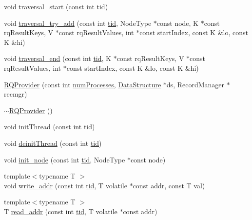 \begin{DoxyCompactItemize}
\item 
void \hyperlink{classRQProvider_a96fe481c7ba6b30efbd90ac1eca1e788}{traversal\+\_\+start} (const int \hyperlink{microbench_2main_8cpp_a9ca9869868fe7e7a38a921cc7de4103f}{tid})
\item 
void \hyperlink{classRQProvider_ae67024f11a58a4a3e4a6cb86b7ed8292}{traversal\+\_\+try\+\_\+add} (const int \hyperlink{microbench_2main_8cpp_a9ca9869868fe7e7a38a921cc7de4103f}{tid}, Node\+Type $\ast$const node, K $\ast$const rq\+Result\+Keys, V $\ast$const rq\+Result\+Values, int $\ast$const start\+Index, const K \&lo, const K \&hi)
\item 
void \hyperlink{classRQProvider_ad4bbd6a7d5ea8f497a49ba3bbd03f7fc}{traversal\+\_\+end} (const int \hyperlink{microbench_2main_8cpp_a9ca9869868fe7e7a38a921cc7de4103f}{tid}, K $\ast$const rq\+Result\+Keys, V $\ast$const rq\+Result\+Values, int $\ast$const start\+Index, const K \&lo, const K \&hi)
\item 
\hyperlink{classRQProvider_a657b85f70daa72353de19671d40bbc22}{R\+Q\+Provider} (const int \hyperlink{testing_8cpp_aa085812188e21ede75351d88b9b2c30d}{num\+Processes}, \hyperlink{classDataStructure}{Data\+Structure} $\ast$ds, Record\+Manager $\ast$recmgr)
\item 
\hyperlink{classRQProvider_aefeec3df4b02ba85843f8dddd0230df8}{$\sim$\+R\+Q\+Provider} ()
\item 
void \hyperlink{classRQProvider_a3485da4cb5f94a1229cd31578b088f85}{init\+Thread} (const int \hyperlink{microbench_2main_8cpp_a9ca9869868fe7e7a38a921cc7de4103f}{tid})
\item 
void \hyperlink{classRQProvider_a3f20b96dfa5a47d9f59ada98e3322695}{deinit\+Thread} (const int \hyperlink{microbench_2main_8cpp_a9ca9869868fe7e7a38a921cc7de4103f}{tid})
\item 
void \hyperlink{classRQProvider_a2cd517d996a170c029435b638c9cf219}{init\+\_\+node} (const int \hyperlink{microbench_2main_8cpp_a9ca9869868fe7e7a38a921cc7de4103f}{tid}, Node\+Type $\ast$const node)
\item 
{\footnotesize template$<$typename T $>$ }\\void \hyperlink{classRQProvider_a2b627a253e65ffdbba9815d0ac3236cb}{write\+\_\+addr} (const int \hyperlink{microbench_2main_8cpp_a9ca9869868fe7e7a38a921cc7de4103f}{tid}, T volatile $\ast$const addr, const T val)
\item 
{\footnotesize template$<$typename T $>$ }\\T \hyperlink{classRQProvider_aa6dcae307b83ce0dc7890155f81659a2}{read\+\_\+addr} (const int \hyperlink{microbench_2main_8cpp_a9ca9869868fe7e7a38a921cc7de4103f}{tid}, T volatile $\ast$const addr)

\end{DoxyCompactItemize}
